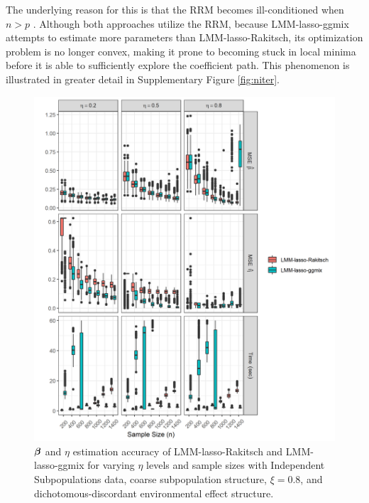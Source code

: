 The underlying reason for this is that the RRM becomes ill-conditioned when $n > p$ \citep{ledoit2004well}. Although both approaches utilize the RRM, because LMM-lasso-ggmix attempts to estimate more parameters than LMM-lasso-Rakitsch, its optimization problem is no longer convex, making it prone to becoming stuck in local minima before it is able to sufficiently explore the coefficient path. This phenomenon is illustrated in greater detail in Supplementary Figure \ref{fig:niter}.

\begin{figure}[H]
    \centering
    \includegraphics[scale = 1]{figures/eta_beta_hat.png}
     \caption{$\boldsymbol{\beta}{}$ and $\eta$ estimation accuracy of LMM-lasso-Rakitsch and LMM-lasso-ggmix for varying $\eta$ levels and sample sizes with Independent Subpopulations data, coarse subpopulation structure, $\xi = 0.8$, and dichotomous-discordant environmental effect structure. }
    \label{fig:eta_beta_mse}
\end{figure}

